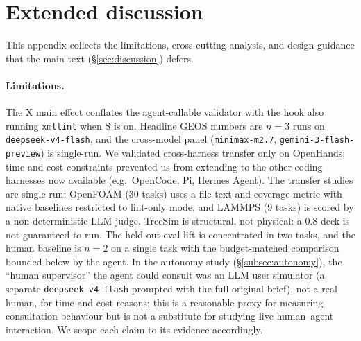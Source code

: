 \documentclass{article}
\begin{document}
\section{Extended discussion}
\label{app:discussion}

This appendix collects the limitations, cross-cutting analysis, and design guidance that the main text (\S\ref{sec:discussion}) defers.

\paragraph{Limitations.}
\label{subsec:limitations}
The $\mathrm{X}$ main effect conflates the agent-callable validator with the hook also running \texttt{xmllint} when $\mathrm{S}$ is on. Headline GEOS numbers are $n=3$ runs on \texttt{deepseek-v4-flash}, and the cross-model panel (\texttt{minimax-m2.7}, \texttt{gemini-3-flash-preview}) is single-run. We validated cross-harness transfer only on OpenHands; time and cost constraints prevented us from extending to the other coding harnesses now available (e.g.\ OpenCode, Pi, Hermes Agent). The transfer studies are single-run: OpenFOAM (30 tasks) uses a file-text-and-coverage metric with native baselines restricted to lint-only mode, and LAMMPS (9 tasks) is scored by a non-deterministic LLM judge. TreeSim is structural, not physical: a $0.8$ deck is not guaranteed to run. The held-out-eval lift is concentrated in two tasks, and the human baseline is $n=2$ on a single task with the budget-matched comparison bounded below by the agent. In the autonomy study (\S\ref{subsec:autonomy}), the ``human supervisor'' the agent could consult was an LLM user simulator (a separate \texttt{deepseek-v4-flash} prompted with the full original brief), not a real human, for time and cost reasons; this is a reasonable proxy for measuring consultation behaviour but is not a substitute for studying live human--agent interaction. We scope each claim to its evidence accordingly.
\end{document}
